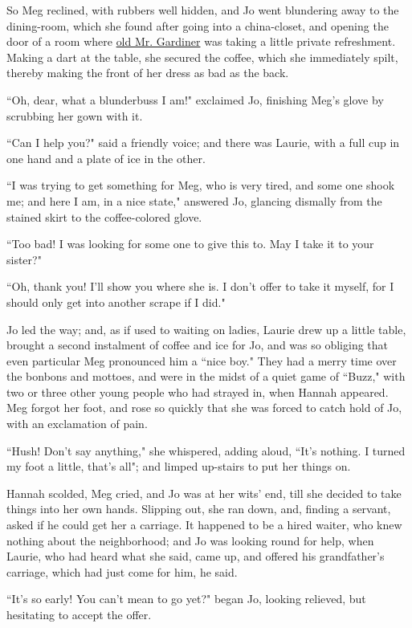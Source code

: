 So Meg reclined, with rubbers well hidden, and Jo went blundering away
to the dining-room, which she found after going into a china-closet, and
opening the door of a room where \underline{old Mr. Gardiner} was taking a
little private refreshment. Making a dart at the table, she secured the
coffee, which she immediately spilt, thereby making the front of her
dress as bad as the back.

``Oh, dear, what a blunderbuss I am!" exclaimed Jo, finishing
Meg's glove by scrubbing her gown with it.

``Can I help you?" said a friendly voice; and there was Laurie, with a
full cup in one hand and a plate of ice in the other.

``I was trying to get something for Meg, who is very tired, and some one
shook me; and here I am, in a nice state," answered Jo, glancing
dismally from the stained skirt to the coffee-colored glove.

``Too bad! I was looking for some one to give this to. May I take it to
your sister?"

``Oh, thank you! I'll show you where she is. I
don't offer to take it myself, for I should only get
into another scrape if I did."

Jo led the way; and, as if used to waiting on ladies, Laurie drew up a
little table, brought a second instalment of coffee and ice for Jo, and
was so obliging that even particular Meg pronounced him a ``nice boy."
They had a merry time over the bonbons and mottoes, and were in the
midst of a quiet game of ``Buzz," with two or three other young people
who had strayed in, when Hannah appeared. Meg forgot her foot, and rose
so quickly that she was forced to catch hold of Jo, with an exclamation
of pain.

``Hush! Don't say anything," she whispered, adding aloud,
``It's nothing. I turned my foot a little,
that's all"; and limped up-stairs to put her things on.

Hannah scolded, Meg cried, and Jo was at her wits' end,
till she decided to take things into her own hands. Slipping out, she
ran down, and, finding a servant, asked if he could get her a carriage.
It happened to be a hired waiter, who knew nothing about the
neighborhood; and Jo was looking round for help, when Laurie, who had
heard what she said, came up, and offered his
grandfather's carriage, which had just come for him, he
said.

``It's so early! You can't mean to go
yet?" began Jo, looking relieved, but hesitating to accept the offer.

